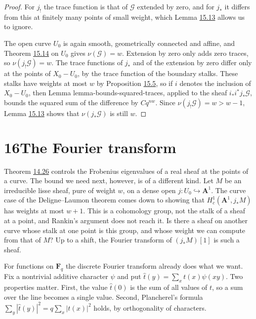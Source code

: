 \documentclass[11pt]{article}
\begin{document}
\begin{proof}[{Proof}]\label{bp166}%
For \(j_!\) the trace function is that of \(\mathcal G\) extended by zero, and for \(j_*\) it differs from this at finitely many points of small weight, which Lemma \hyperref[bp159]{15.13} allows us to ignore.

The open curve \(U_0\) is again smooth, geometrically connected and affine, and Theorem \hyperref[bp162]{15.14} on \(U_0\) gives \(\nu(\mathcal G)=w\). Extension by zero only adds zero traces, so \(\nu(j_!\mathcal G)=w\). The trace functions of \(j_*\) and of the extension by zero differ only at the points of \(X_0-U_0\), by the trace function of the boundary stalks. These stalks have weights at most \(w\) by Proposition \hyperref[bp134]{15.5}, so if \(i\) denotes the inclusion of \(X_0-U_0\), then Lemma lemma-bounds-squared-traces, applied to the sheaf \(i_*i^*j_*\mathcal G\), bounds the squared sum of the difference by \(Cq^{nw}\). Since \(\nu(j_!\mathcal G)=w>w-1\), Lemma \hyperref[bp159]{15.13} shows that \(\nu(j_*\mathcal G)\) is still \(w\).
\end{proof}



\section*{\texorpdfstring{16\quad The Fourier transform}{16 The Fourier transform}}
\label{bp167}%
\label{bp168}%
Theorem \hyperref[bp120]{14.26} controls the Frobenius eigenvalues of a real sheaf at the points of a curve. The bound we need next, however, is of a different kind. Let \(M\) be an irreducible lisse sheaf, pure of weight \(w\), on a dense open \(j:U_0\hookrightarrow\mathbf A^1\). The curve case of the Deligne–Laumon theorem comes down to showing that \(H^1_c(\mathbf A^1,j_*M)\) has weights at most \(w+1\). This is a cohomology group, not the stalk of a sheaf at a point, and Rankin's argument does not reach it. Is there a sheaf on another curve whose stalk at one point is this group, and whose weight we can compute from that of \(M\)? Up to a shift, the Fourier transform of \((j_*M)[1]\) is such a sheaf.

For functions on \(\mathbf F_q\) the discrete Fourier transform already does what we want. Fix a nontrivial additive character \(\psi\) and put \(\hat t(y)=\sum_xt(x)\psi(xy)\). Two properties matter. First, the value \(\hat t(0)\) is the sum of all values of \(t\), so a sum over the line becomes a single value. Second, Plancherel's formula \(\sum_y|\hat t(y)|^2=q\sum_x|t(x)|^2\) holds, by orthogonality of characters.
\end{document}
